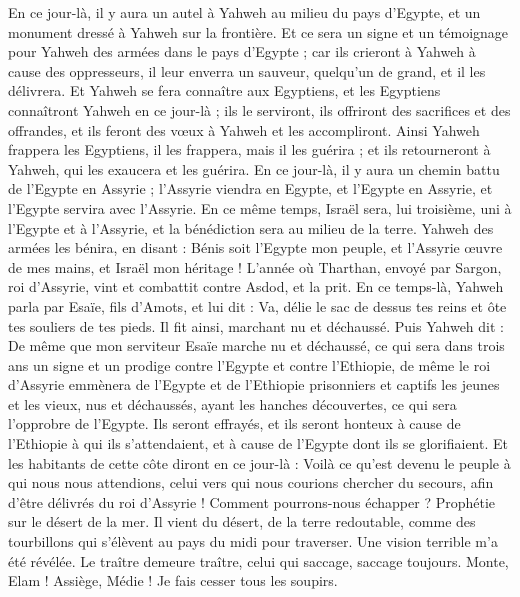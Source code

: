 \begin{multicols}{2}
En ce jour-là, il y aura un autel à Yahweh au milieu du pays d'Egypte, et un monument dressé à Yahweh sur la frontière.
Et ce sera un signe et un témoignage pour Yahweh des armées dans le pays d'Egypte ; car ils crieront à Yahweh à cause des oppresseurs, il leur enverra un sauveur, quelqu'un de grand, et il les délivrera.
Et Yahweh se fera connaître aux Egyptiens, et les Egyptiens connaîtront Yahweh en ce jour-là ; ils le serviront, ils offriront des sacrifices et des offrandes, et ils feront des vœux à Yahweh et les accompliront.
Ainsi Yahweh frappera les Egyptiens, il les frappera, mais il les guérira ; et ils retourneront à Yahweh, qui les exaucera et les guérira.
En ce jour-là, il y aura un chemin battu de l'Egypte en Assyrie ; l'Assyrie viendra en Egypte, et l'Egypte en Assyrie, et l'Egypte servira avec l'Assyrie.
En ce même temps, Israël sera, lui troisième, uni à l'Egypte et à l'Assyrie, et la bénédiction sera au milieu de la terre.
Yahweh des armées les bénira, en disant : Bénis soit l'Egypte mon peuple, et l'Assyrie œuvre de mes mains, et Israël mon héritage !
\VerseOne{}L'année où Tharthan, envoyé par Sargon, roi d'Assyrie, vint et combattit contre Asdod, et la prit.
En ce temps-là, Yahweh parla par Esaïe, fils d'Amots, et lui dit : Va, délie le sac de dessus tes reins et ôte tes souliers de tes pieds. Il fit ainsi, marchant nu et déchaussé.
Puis Yahweh dit : De même que mon serviteur Esaïe marche nu et déchaussé, ce qui sera dans trois ans un signe et un prodige contre l'Egypte et contre l'Ethiopie,
de même le roi d'Assyrie emmènera de l'Egypte et de l'Ethiopie prisonniers et captifs les jeunes et les vieux, nus et déchaussés, ayant les hanches découvertes, ce qui sera l'opprobre de l'Egypte.
Ils seront effrayés, et ils seront honteux à cause de l'Ethiopie à qui ils s'attendaient, et à cause de l'Egypte dont ils se glorifiaient.
Et les habitants de cette côte diront en ce jour-là : Voilà ce qu'est devenu le peuple à qui nous nous attendions, celui vers qui nous courions chercher du secours, afin d'être délivrés du roi d'Assyrie ! Comment pourrons-nous échapper ?
\VerseOne{}Prophétie sur le désert de la mer. Il vient du désert, de la terre redoutable, comme des tourbillons qui s'élèvent au pays du midi pour traverser.
Une vision terrible m'a été révélée. Le traître demeure traître, celui qui saccage, saccage toujours. Monte, Elam ! Assiège, Médie ! Je fais cesser tous les soupirs.

\end{multicols}
